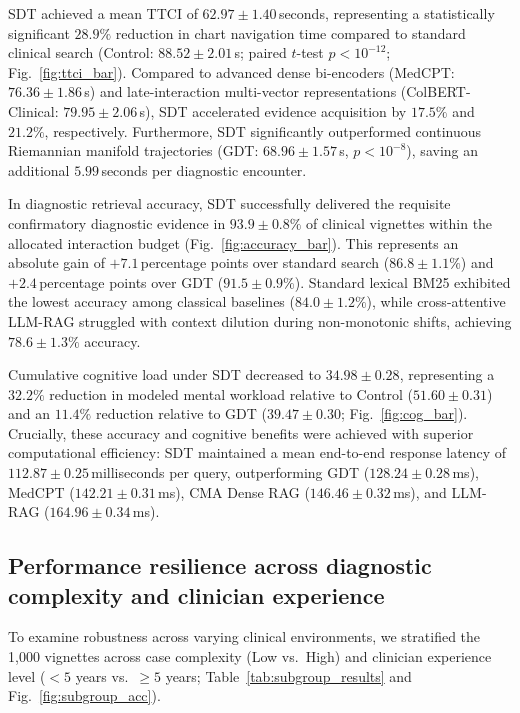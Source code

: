 \documentclass[12pt]{article}
\begin{document}
SDT achieved a mean TTCI of $62.97 \pm 1.40$\,seconds, representing a statistically significant $28.9\%$ reduction in chart navigation time compared to standard clinical search (Control: $88.52 \pm 2.01$\,s; paired $t$-test $p < 10^{-12}$; Fig.~\ref{fig:ttci_bar}). Compared to advanced dense bi-encoders (MedCPT: $76.36 \pm 1.86$\,s) and late-interaction multi-vector representations (ColBERT-Clinical: $79.95 \pm 2.06$\,s), SDT accelerated evidence acquisition by $17.5\%$ and $21.2\%$, respectively. Furthermore, SDT significantly outperformed continuous Riemannian manifold trajectories (GDT: $68.96 \pm 1.57$\,s, $p < 10^{-8}$), saving an additional $5.99$\,seconds per diagnostic encounter.

In diagnostic retrieval accuracy, SDT successfully delivered the requisite confirmatory diagnostic evidence in $93.9 \pm 0.8\%$ of clinical vignettes within the allocated interaction budget (Fig.~\ref{fig:accuracy_bar}). This represents an absolute gain of $+7.1$\,percentage points over standard search ($86.8 \pm 1.1\%$) and $+2.4$\,percentage points over GDT ($91.5 \pm 0.9\%$). Standard lexical BM25 exhibited the lowest accuracy among classical baselines ($84.0 \pm 1.2\%$), while cross-attentive LLM-RAG struggled with context dilution during non-monotonic shifts, achieving $78.6 \pm 1.3\%$ accuracy.

Cumulative cognitive load under SDT decreased to $34.98 \pm 0.28$, representing a $32.2\%$ reduction in modeled mental workload relative to Control ($51.60 \pm 0.31$) and an $11.4\%$ reduction relative to GDT ($39.47 \pm 0.30$; Fig.~\ref{fig:cog_bar}). Crucially, these accuracy and cognitive benefits were achieved with superior computational efficiency: SDT maintained a mean end-to-end response latency of $112.87 \pm 0.25$\,milliseconds per query, outperforming GDT ($128.24 \pm 0.28$\,ms), MedCPT ($142.21 \pm 0.31$\,ms), CMA Dense RAG ($146.46 \pm 0.32$\,ms), and LLM-RAG ($164.96 \pm 0.34$\,ms).

\subsection*{Performance resilience across diagnostic complexity and clinician experience}

To examine robustness across varying clinical environments, we stratified the 1,000 vignettes across case complexity (Low vs.\ High) and clinician experience level ($<5$ years vs.\ $\ge 5$ years; Table~\ref{tab:subgroup_results} and Fig.~\ref{fig:subgroup_acc}).
\end{document}
